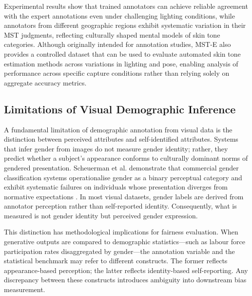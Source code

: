 Experimental results show that trained annotators can achieve reliable
agreement with the expert annotations even under challenging lighting
conditions, while annotators from different geographic regions exhibit
systematic variation in their MST judgments, reflecting culturally shaped
mental models of skin tone categories. Although originally intended for
annotation studies, MST-E also provides a controlled dataset that can be
used to evaluate automated skin tone estimation methods across variations
in lighting and pose, enabling analysis of performance across specific
capture conditions rather than relying solely on aggregate accuracy metrics.




\subsection{Limitations of Visual Demographic Inference}

A fundamental limitation of demographic annotation from visual data is the distinction between perceived attributes and self-identified attributes. Systems that infer gender from images do not measure gender identity; rather, they predict whether a subject’s appearance conforms to culturally dominant norms of gendered presentation. Scheuerman et al. demonstrate that commercial gender classification systems operationalise gender as a binary perceptual category and exhibit systematic failures on individuals whose presentation diverges from normative expectations \cite{Scheuerman_2019_HowComputersSeeGender}. In most visual datasets, gender labels are derived from annotator perception rather than self-reported identity. Consequently, what is measured is not gender identity but perceived gender expression.

This distinction has methodological implications for fairness evaluation. When generative outputs are compared to demographic statistics—such as labour force participation rates disaggregated by gender—the annotation variable and the statistical benchmark may refer to different constructs. The former reflects appearance-based perception; the latter reflects identity-based self-reporting. Any discrepancy between these constructs introduces ambiguity into downstream bias measurement.


